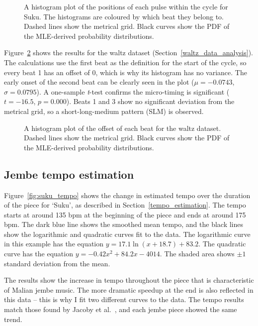 \documentclass[12pt,twoside,openright]{report}
\begin{document}
\begin{figure}[ht]
    \centering
    
    \caption{A histogram plot of the positions of each pulse within the cycle for Suku. The histograms are coloured by which beat they belong to. Dashed lines show the metrical grid. Black curves show the PDF of the MLE-derived probability distributions.}
    \label{fig:suku_histogram}
\end{figure}

Figure~\ref{fig:waltz_histogram} shows the results for the waltz dataset (Section~\ref{waltz_data_analysis}). The calculations
use the first beat as the definition for the start of the cycle, so every beat 1
has an offset of 0, which is why its histogram has no variance. The early onset
of the second beat can be clearly seen in the plot ($\mu=-0.0743$, $\sigma=0.0795$). A
one-sample \textit{t}-test confirms the micro-timing is significant ($t=-16.5$, $p=0.000$). Beats 1 and 3 show no significant deviation from the metrical grid, so a short-long-medium pattern (SLM) is observed.

\begin{figure}[ht]
    \centering
    
    \caption{A histogram plot of the offset of each beat for the waltz dataset. Dashed lines show the metrical grid. Black curves show the PDF of the MLE-derived probability distributions.}
    \label{fig:waltz_histogram}
\end{figure}


\subsection{Jembe tempo estimation} \label{jembe_tempo_estimation_results}

Figure~\ref{fig:suku_tempo} shows the change in estimated tempo over the duration of the piece for
`Suku', as described in Section~\ref{tempo_estimation}. The tempo starts at around 135 bpm at the beginning of the piece and
ends at around 175 bpm. The dark blue line shows the smoothed mean tempo, and
the black lines show the logarithmic and quadratic curves fit to the data. The
logarithmic curve in this example has the equation $y=17.1 \ln(x+18.7)+83.2$.
The quadratic curve has the equation $y=-0.42x^2+84.2x-4014$. The
shaded area shows $\pm1$ standard deviation from the mean.

The results show the increase in tempo throughout the piece that is characteristic of Malian jembe music. The more dramatic speedup at the end is also reflected in this data -- this is why I fit two different curves to the data. The tempo results match those found by Jacoby et al.\ \cite{jacoby2021supp}, and each jembe piece showed the same trend.
\end{document}
